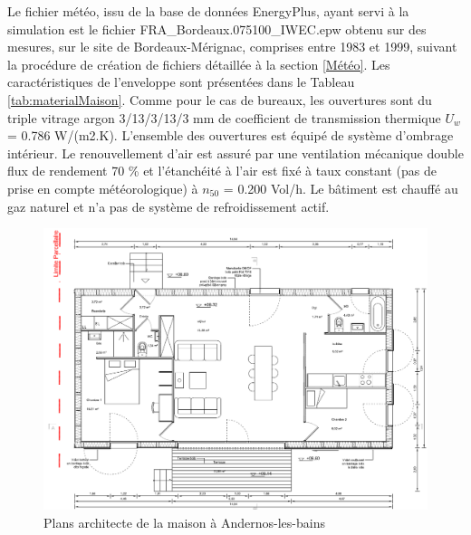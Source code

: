 Le fichier météo, issu de la base de données EnergyPlus, ayant servi à la simulation est le fichier FRA\_Bordeaux.075100\_IWEC.epw obtenu sur des mesures, sur le site de Bordeaux-Mérignac, comprises entre 1983 et 1999, suivant la procédure de création de fichiers détaillée à la section \ref{Météo}. Les caractéristiques de l'enveloppe sont présentées dans le Tableau \ref{tab:materialMaison}. Comme pour le cas de bureaux, les ouvertures sont du triple vitrage argon 3/13/3/13/3 mm de coefficient de transmission thermique $U_{w}$ = 0.786 W/(m2.K). L'ensemble des ouvertures est équipé de système d'ombrage intérieur. Le renouvellement d'air est assuré par une ventilation mécanique double flux de rendement 70 \% et l'étanchéité à l'air est fixé à taux constant (pas de prise en compte météorologique) à $n_{50}$ = 0.200 Vol/h. Le bâtiment est chauffé au gaz naturel et n'a pas de système de refroidissement actif.

\begin{figure}[H]
\centering
\includegraphics[scale=0.55]{Images/PlanMaison}
\caption{Plans architecte de la maison à Andernos-les-bains}
\label{fig:PlanMaison}
\end{figure}

